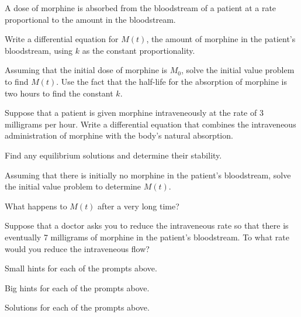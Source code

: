 \begin{activity} \label{A:7.4.1}  
A dose of morphine is 
        absorbed from the bloodstream of a patient at a rate
        proportional to the amount in the bloodstream.  

        \ba
        \item Write a differential equation for $M(t)$, the amount of
          morphine in the patient's bloodstream, using $k$ as the
          constant proportionality.
        \item 
          Assuming that the initial dose of morphine is $M_0$,
          solve the initial value problem to find $M(t)$.  Use the
          fact that the half-life for the absorption of morphine is
          two hours to find the constant $k$.
        \item Suppose that a patient is given morphine intraveneously
          at the rate of 3 milligrams per hour.  Write a differential
          equation that combines the intraveneous administration of
          morphine with the body's natural absorption.
        \item Find any equilibrium solutions and determine their
          stability. 
        \item Assuming that there is initially no morphine in the
          patient's bloodstream, solve the initial value problem to
          determine $M(t)$.
        \item What happens to $M(t)$ after a very long time?
        \item Suppose that a doctor asks you to reduce the
          intraveneous rate so that there is eventually 7 milligrams
          of morphine in the patient's bloodstream.  To what rate
          would you reduce the intraveneous flow?

\ea
\end{activity}
\begin{smallhint}
\ba
	\item Small hints for each of the prompts above.
\ea
\end{smallhint}
\begin{bighint}
\ba
	\item Big hints for each of the prompts above.
\ea
\end{bighint}
\begin{activitySolution}
\ba
	\item Solutions for each of the prompts above.
\ea
\end{activitySolution}
\aftera